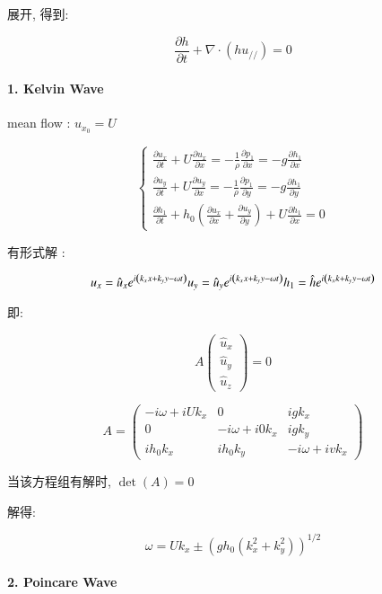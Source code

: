 \documentclass[fontset=windows]{report}
\begin{document}
展开, 得到:

\[\frac{\partial h}{\partial t}+\nabla\cdot(hu_{//})=0\]

\hypertarget{1-kelvin-wave}{%
\paragraph{1. Kelvin Wave}\label{1-kelvin-wave}}

mean flow : \(u_{x_0}=U\)

\[\left\{\begin{array}{l}\frac{\partial u_{x}}{\partial t}+U \frac{\partial u_{x}}{\partial x}=-\frac{1}{\rho} \frac{\partial p_{1}}{\partial x}=-g \frac{\partial h_{1}}{\partial x} \\\frac{\partial u_{y}}{\partial t}+U \frac{\partial u_{y}}{\partial x}=-\frac{1}{\rho} \frac{\partial p_{1}}{\partial y}=-g \frac{\partial h_{1}}{\partial y} \\
\frac{\partial h_{1}}{\partial t}+h_{0}\left( \frac{\partial u_{x}}{\partial x}+\frac{\partial u_{y}}{\partial y}\right)+U \frac{\partial h_{1}}{\partial x}=0 \end{array}\right.\]

有形式解 :

\[u_{x}=\hat{u}_{x} e^{i\left(k_{x} x+k_{y} y-\omega t\right)} \\u_{y}=\hat{u}_{y} e^{i\left(k_{x} x+k_{y} y-\omega t\right)} \\h_{1}=\hat{h} e^{i\left(k_{x} k+k_{y} y-\omega t\right)}\]

即:

\[A \left(\begin{matrix}
   \hat u_x \\
   \hat u_y \\
   \hat u_z
  \end{matrix}\right)=0\]

\[A=\left(\begin{array}{ccc}-i \omega+i U k_{x} & 0 & i g k_{x} \\0 & -i \omega+i 0 k_{x} & i g k_{y} \\i h_{0} k_{x} & i h_{0} k_{y} & -i \omega+i v k_{x}\end{array}\right)\]

当该方程组有解时, \(\det (A)=0\)

解得:

\[\omega = Uk_x\pm(gh_0(k_x^2+k_y^2))^{1/2}\]

\hypertarget{2-poincare-wave}{%
\paragraph{2. Poincare Wave}\label{2-poincare-wave}}
\end{document}

